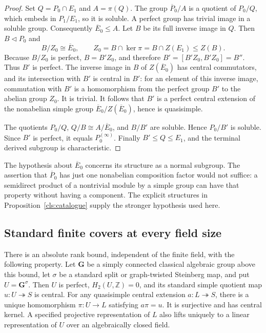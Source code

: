 \begin{proof}
Set $Q=P_0\cap E_1$ and $A=\pi(Q)$.  The group $\overline P_0/A$ is a
quotient of $P_0/Q$, which embeds in $P_1/E_1$, so it is soluble.  A perfect
group has trivial image in a soluble group.  Consequently
$\overline E_0\leq A$.  Let $B$ be its full inverse image in $Q$.  Then
$B\lhd P_0$ and
\[
 B/Z_0\cong\overline E_0,
 \qquad Z_0=B\cap\ker\pi=B\cap Z(E_1)\leq Z(B).
\]
Because $B/Z_0$ is perfect, $B=B'Z_0$, and therefore
$B'=[B'Z_0,B'Z_0]=B''$.  Thus $B'$ is perfect.  The inverse image in $B$
of $Z(\overline E_0)$ has central commutators, and its intersection with
$B'$ is central in $B'$: for an element of this inverse image, commutation
with $B'$ is a homomorphism from the perfect group $B'$ to the abelian
group $Z_0$.  It is trivial.  It follows that $B'$ is a perfect central
extension of the nonabelian simple group
$\overline E_0/Z(\overline E_0)$, hence is quasisimple.

The quotients $P_0/Q$, $Q/B\cong A/\overline E_0$, and $B/B'$ are
soluble.  Hence $P_0/B'$ is soluble.  Since $B'$ is perfect, it equals
$P_0^{(\infty)}$.  Finally $B'\leq Q\leq E_1$, and the terminal derived
subgroup is characteristic.
\end{proof}

\begin{remark}\label{lift:not-composition-count}
The hypothesis about $\overline E_0$ concerns its structure as a normal
subgroup.  The assertion that $\overline P_0$ has just one nonabelian
composition factor would not suffice: a semidirect product of a nontrivial
module by a simple group can have that property without having a component.
The explicit structures in Proposition~\ref{cls:catalogue} supply the
stronger hypothesis used here.
\end{remark}

\subsection{Standard finite covers at every field size}

\begin{lemma}\label{lift:finite-covers}
There is an absolute rank bound, independent of the finite field,
with the following property.  Let $\mathbf G$ be a simply connected
classical algebraic group above this bound, let $\sigma$ be a standard
split or graph-twisted Steinberg map, and put $U=\mathbf G^\sigma$.
Then $U$ is perfect, $H_2(U,\mathbb Z)=0$, and its standard simple
quotient map $u:U\twoheadrightarrow S$ is central.  For any quasisimple
central extension $a:L\twoheadrightarrow S$, there is a unique
homomorphism $\pi:U\to L$ satisfying $a\pi=u$.  It is surjective and
has central kernel.  A specified projective representation of $L$
also lifts uniquely to a linear representation of $U$ over an
algebraically closed field.
\end{lemma}


